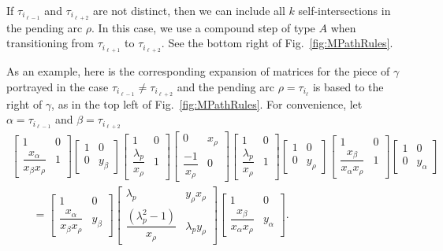 If $\tau_{i_{\ell-1}}$ and $\tau_{i_{\ell+2}}$ are not distinct, then we can include all $k$ self-intersections in the pending arc $\rho$. In this case, we use a compound step of type $A$ when transitioning from $\tau_{i_{\ell+1}}$ to $\tau_{i_{\ell+2}}$. See the bottom right of Fig.~\ref{fig:MPathRules}.

\begin{Example} As an example, here is the corresponding expansion of matrices for the piece of $\gamma$ portrayed in the case $\tau_{i_{\ell-1}} \neq \tau_{i_{\ell+2}}$ and the pending arc $\rho = \tau_{i_\ell}$ is based to the right of $\gamma$, as in the top left of Fig.~\ref{fig:MPathRules}. For convenience, let $\alpha = \tau_{i_{\ell-1}}$ and $\beta = \tau_{i_{\ell + 2}}$
 \begin{gather*}
 \begin{bmatrix} 1 & 0 \\ \dfrac{x_\alpha}{x_\beta x_\rho} & 1 \end{bmatrix}
 \begin{bmatrix} 1 & 0 \\ 0 & y_{\beta} \end{bmatrix} \begin{bmatrix} 1 & 0 \\ \dfrac{\lambda_p}{x_\rho} & 1 \end{bmatrix}
\begin{bmatrix} 0 & x_\rho \\ \dfrac{-1}{x_\rho} & 0 \end{bmatrix}
 \begin{bmatrix} 1 & 0 \\ \dfrac{\lambda_p}{x_\rho} & 1 \end{bmatrix}
 \begin{bmatrix} 1 & 0 \\ 0 & y_{\rho} \end{bmatrix}
 \begin{bmatrix} 1 & 0 \\ \dfrac{x_\beta}{x_\alpha x_\rho} & 1 \end{bmatrix}
 \begin{bmatrix} 1 & 0 \\ 0 & y_{\alpha} \end{bmatrix}
\\
\qquad{}
= \begin{bmatrix} 1 & 0 \\ \dfrac{x_\alpha}{x_\beta x_\rho} & y_\beta \end{bmatrix}
\begin{bmatrix} \lambda_p & y_{\rho} x_{\rho} \\ \dfrac{(\lambda_p^2 - 1)}{x_{\rho}} & \lambda_p y_{\rho}\end{bmatrix}
 \begin{bmatrix} 1 & 0 \\ \dfrac{x_\beta}{x_\alpha x_\rho} & y_\alpha \end{bmatrix}.
\end{gather*}


\end{Example}
